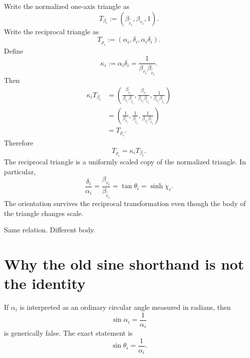 \documentclass[11pt]{article}
\newcommand{\ccomp}[1]{\widehat{\widetilde{c}}_{#1}}
\begin{document}
Write the normalized one-axis triangle as
\begin{equation}
T_{\beta_i}
:=
\left(\beta_{\ccomp{i}},\beta_{v_i},1\right).
\label{eq:Tbeta}
\end{equation}
Write the reciprocal triangle as
\begin{equation}
T_{\rho_i}
:=
\left(\alpha_i,\delta_i,\alpha_i\delta_i\right).
\label{eq:Trho}
\end{equation}
Define
\begin{equation}
\kappa_i
:=
\alpha_i\delta_i
=
\frac{1}{\beta_{v_i}\beta_{\ccomp{i}}}.
\label{eq:kappa}
\end{equation}
Then
\begin{align}
\kappa_i T_{\beta_i}
&=
\left(
\frac{\beta_{\ccomp{i}}}
{\beta_{v_i}\beta_{\ccomp{i}}},
\frac{\beta_{v_i}}
{\beta_{v_i}\beta_{\ccomp{i}}},
\frac{1}{\beta_{v_i}\beta_{\ccomp{i}}}
\right)\\
&=
\left(
\frac{1}{\beta_{v_i}},
\frac{1}{\beta_{\ccomp{i}}},
\frac{1}{\beta_{v_i}\beta_{\ccomp{i}}}
\right)\\
&=
T_{\rho_i}.
\label{eq:triangle-similarity}
\end{align}
Therefore
\begin{equation}
\boxed{T_{\rho_i}=\kappa_i T_{\beta_i}.}
\label{eq:boxed-similarity}
\end{equation}
The reciprocal triangle is a uniformly scaled copy of the normalized
triangle. In particular,
\begin{equation}
\frac{\delta_i}{\alpha_i}
=
\frac{\beta_{v_i}}{\beta_{\ccomp{i}}}
=
\tan\theta_i
=
\sinh\chi_i.
\label{eq:same-slope}
\end{equation}
The orientation survives the reciprocal transformation even though the body
of the triangle changes scale.

Same relation. Different body.

\section{Why the old sine shorthand is not the identity}

If $\alpha_i$ is interpreted as an ordinary circular angle measured in
radians, then
\begin{equation}
\sin\alpha_i=\frac{1}{\alpha_i}
\label{eq:not-identity}
\end{equation}
is generically false. The exact statement is
\begin{equation}
\sin\theta_i
=
\frac{1}{\alpha_i}.
\label{eq:exact-sine}
\end{equation}
\end{document}
